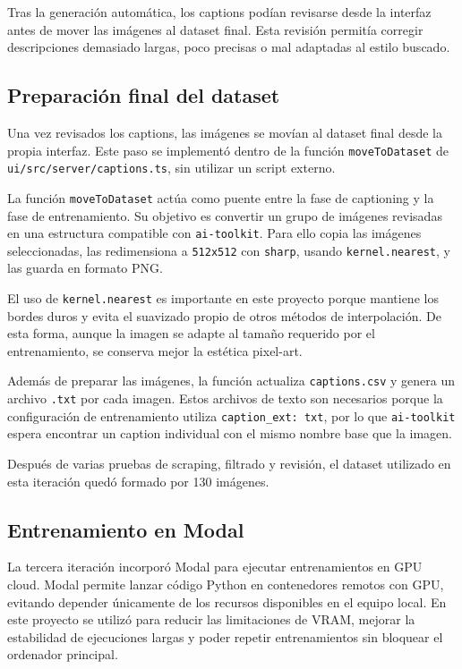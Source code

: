 \documentclass[a4paper,11pt,titlepage]{scrbook}
\begin{document}
Tras la generación automática, los captions podían revisarse desde la interfaz antes de mover las imágenes al dataset final. Esta revisión permitía corregir descripciones demasiado largas, poco precisas o mal adaptadas al estilo buscado.

\subsection{Preparación final del dataset}

Una vez revisados los captions, las imágenes se movían al dataset final desde la propia interfaz. Este paso se implementó dentro de la función \texttt{moveToDataset} de \texttt{ui/src/server/captions.ts}, sin utilizar un script externo.

La función \texttt{moveToDataset} actúa como puente entre la fase de captioning y la fase de entrenamiento. Su objetivo es convertir un grupo de imágenes revisadas en una estructura compatible con \texttt{ai-toolkit}. Para ello copia las imágenes seleccionadas, las redimensiona a \texttt{512x512} con \texttt{sharp}, usando \texttt{kernel.nearest}, y las guarda en formato PNG.

El uso de \texttt{kernel.nearest} es importante en este proyecto porque mantiene los bordes duros y evita el suavizado propio de otros métodos de interpolación. De esta forma, aunque la imagen se adapte al tamaño requerido por el entrenamiento, se conserva mejor la estética pixel-art.

Además de preparar las imágenes, la función actualiza \texttt{captions.csv} y genera un archivo \texttt{.txt} por cada imagen. Estos archivos de texto son necesarios porque la configuración de entrenamiento utiliza \texttt{caption\_ext: txt}, por lo que \texttt{ai-toolkit} espera encontrar un caption individual con el mismo nombre base que la imagen.

Después de varias pruebas de scraping, filtrado y revisión, el dataset utilizado en esta iteración quedó formado por 130 imágenes. 

\subsection{Entrenamiento en Modal}

La tercera iteración incorporó Modal para ejecutar entrenamientos en GPU cloud. Modal permite lanzar código Python en contenedores remotos con GPU, evitando depender únicamente de los recursos disponibles en el equipo local. En este proyecto se utilizó para reducir las limitaciones de VRAM, mejorar la estabilidad de ejecuciones largas y poder repetir entrenamientos sin bloquear el ordenador principal.
\end{document}

